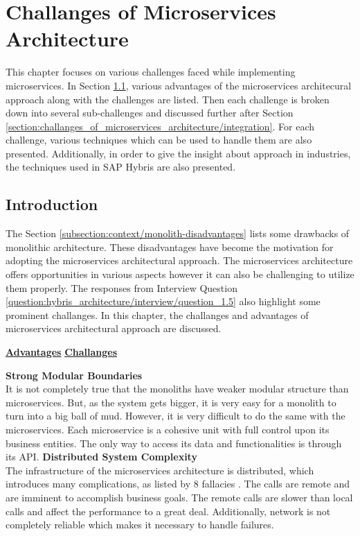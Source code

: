\chapter{Challanges of Microservices Architecture}\label{chapter:challanges_of_microservices_architecture}
This chapter focuses on various challenges faced while implementing microservices. In Section \ref{section:challanges_of_microservices_architecture/introduction}, various advantages of the microservices architecural approach along with the challenges are listed. Then each challenge is broken down into several sub-challenges and discussed further after Section \ref{section:challanges_of_microservices_architecture/integration}. For each challenge, various techniques which can be used to handle them are also presented. Additionally, in order to give the insight about approach in industries, the techniques used in SAP Hybris are also presented.
\section{Introduction}\label{section:challanges_of_microservices_architecture/introduction}
The Section \ref{subsection:context/monolith-disadvantages} lists some drawbacks of monolithic architecture. These disadvantages have become the motivation for adopting the microservices architectural approach. The microservices architecture offers opportunities in various aspects however it can also be challenging to utilize them properly. The responses from Interview Question \ref{question:hybris_architecture/interview/question_1.5} also highlight some prominent challanges. In this chapter, the challanges and advantages of microservices architectural approach are discussed. \cite{Fowler:2015aa}

\label{section:challanges_of_microservices_architecture/introduction/challenges}
  \begin{multicols}{2}
  \textbf{\underline{Advantages}} 
  \vfill
  \columnbreak
  \textbf{\underline{Challanges}}
  \end{multicols}
  \begin{multicols}{2}
  \textbf{Strong Modular Boundaries} \\It is not completely true that the monoliths have weaker modular structure than microservices. But, as the system gets bigger, it is very easy for a monolith to turn into a big ball of mud. However, it is very difficult to do the same with the microservices. Each microservice is a cohesive unit with full control upon its business entities. The only way to access its data and functionalities is through its \acrshort{API}.
  \vfill
  \columnbreak
  \textbf{Distributed System Complexity} \\The infrastructure of the microservices architecture is distributed, which introduces many complications, as listed by 8 fallacies \cite{Factor:2014aa}. The calls are remote and are imminent to accomplish business goals. The remote calls are slower than local calls and affect the performance to a great deal. Additionally, network is not completely reliable which makes it necessary to handle failures.
  \end{multicols}

